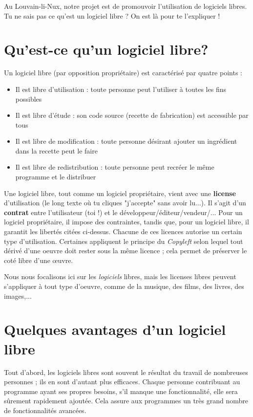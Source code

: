 \documentclass[11pt]{../fiche}
\begin{document}

\vspace*{0.5cm} Au Louvain-li-Nux, notre projet est de promouvoir l'utilisation de logiciels libres. Tu ne sais pas ce qu'est un logiciel libre ? On est là pour te l'expliquer !

\section*{Qu'est-ce qu'un logiciel libre?}

Un logiciel libre (par opposition propriétaire) est caractérisé par quatre points :
\begin{itemize}
\item Il est libre d'utilisation : toute personne peut l'utiliser à toutes les fins possibles
\item Il est libre d'étude : son code source (recette de fabrication) est accessible par tous
\item Il est libre de modification : toute personne désirant ajouter un ingrédient dans la recette peut le faire
\item Il est libre de redistribution : toute personne peut recréer le même programme et le distribuer
\end{itemize}

Une logiciel libre, tout comme un logiciel propriétaire, vient avec une
\textbf{license} d'utilisation (le long texte où tu cliques "j'accepte" sans
avoir lu...). Il s'agit d'un \textbf{contrat} entre l'utilisateur (toi !) et
le développeur/éditeur/vendeur/... Pour un logiciel propriétaire, il
impose des contraintes, tandis que, pour un logiciel libre, il garantit les
libertés citées ci-dessus.
 Chacune de ces licences autorise un certain type d'utilisation. Certaines appliquent le principe du \textit{Copyleft} selon lequel tout dérivé d'une oeuvre doit rester sous la même licence ; cela permet de préserver le coté libre d'une œuvre.
 
 Nous nous focalisons ici sur les \textit{logiciels} libres, mais les licenses libres peuvent s'appliquer à tout type d'oeuvre, comme de la musique, des films, des livres, des images,...

\section*{Quelques avantages d'un logiciel libre}

Tout d'abord, les logiciels libres sont souvent le résultat du travail de nombreuses personnes ; ils en sont d'autant plus efficaces. Chaque personne contribuant au programme ayant ses propres besoins, s'il manque une fonctionnalité, elle sera sûrement rapidement ajoutée. Cela assure aux programmes un très grand nombre de fonctionnalités avancées.
\end{document}
